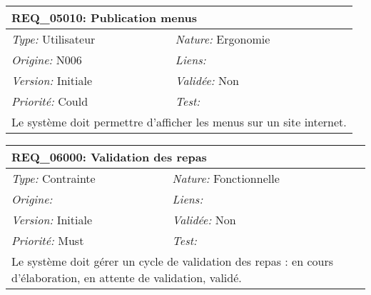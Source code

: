\begin{table}[!h]

\begin{tabular}{|p{60mm}p{100mm}|}

\hline

\multicolumn{2}{|l|}{\textbf{REQ\_05010:} Publication menus} \\ \hline

\emph{Type:} Utilisateur & \emph{Nature:} Ergonomie \\

\emph{Origine:} N006 & \emph{Liens:}  \\

\emph{Version:} Initiale & \emph{Validée:} Non \\

\emph{Priorité:} Could & \emph{Test:} \\ \hline

\multicolumn{2}{|p{16cm}|}{Le système doit permettre d'afficher les menus sur un site internet.} \\ \hline

\end{tabular}

\end{table}



\begin{table}[!h]

\begin{tabular}{|p{60mm}p{100mm}|}

\hline

\multicolumn{2}{|l|}{\textbf{REQ\_06000:} Validation des repas} \\ \hline

\emph{Type:} Contrainte & \emph{Nature:} Fonctionnelle \\

\emph{Origine:}  & \emph{Liens:}  \\

\emph{Version:} Initiale & \emph{Validée:} Non \\

\emph{Priorité:} Must & \emph{Test:} \\ \hline

\multicolumn{2}{|p{16cm}|}{Le système doit gérer un cycle de validation des repas : en cours d'élaboration, en attente de validation, validé.} \\ \hline

\end{tabular}

\end{table}



